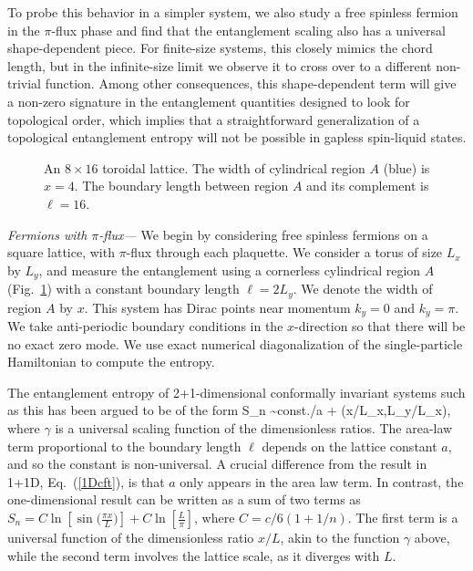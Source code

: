 \documentclass[prl,aps,twocolumn,floatfix,amsmath,amssymb,superscriptaddress,tightenlines]{revtex4}
\begin{document}
To probe this behavior in a simpler system, we also study
a free spinless fermion in the $\pi$-flux phase and find that the entanglement scaling also has a universal shape-dependent piece.
For finite-size systems, this closely mimics the chord length, but in the infinite-size limit we observe it to cross over to a different non-trivial function.
Among other consequences, this shape-dependent term will give a non-zero signature in the entanglement quantities \cite{KP,LW} designed to look for topological order, which implies that a straightforward generalization of a topological entanglement entropy will not be possible in gapless spin-liquid states. 
 
  \begin{figure}
   \begin{center}
   \end{center}
   \caption{An $8 \times 16$ toroidal lattice.  The width of cylindrical region $A$ (blue) is $x=4$.  The boundary length between region $A$ and its complement is $\ell = 16$. }
   \label{fig:torus}
 \end{figure}
 
{\it Fermions with $\pi$-flux---}
We begin by considering
free spinless fermions on a square lattice, with $\pi$-flux through each plaquette.  We consider a torus of size $L_x$ by $L_y$, and
measure the entanglement %
using a cornerless cylindrical region $A$ (Fig.~\ref{fig:torus}) with a constant boundary length $\ell = 2L_y$.
We denote the width of region $A$ by $x$.
This system has Dirac points near momentum $k_y=0$ and $k_y=\pi$.  We take anti-periodic boundary conditions in the $x$-direction so that there will be no exact zero mode.  We use exact numerical diagonalization of the single-particle Hamiltonian to compute the entropy.

The entanglement entropy of 2+1-dimensional conformally invariant systems such as this has been argued to be of the form \cite{ryu,ZGV}
\be
S_n \sim {\rm const.}\times \ell /a + \gamma(x/L_x,L_y/L_x),
\ee
where $\gamma$ is a universal scaling function of the dimensionless ratios.
The area-law term proportional to the boundary length $\ell$ depends on the lattice constant $a$, and so the constant is non-universal. A crucial difference
from the result in 1+1D, Eq.~(\ref{1Dcft}), is that $a$ only appears in the area law term.  In contrast, the one-dimensional result can be written as a sum of two terms as
$S_n =C \ln[\sin\big( \frac{\pi x}{L} \big)]+ C\ln[\frac{L}{\pi}] $, where $C=c/6(1+1/n)$.
The first term is a universal function of the dimensionless ratio $x/L$, akin to the function $\gamma$ above, while the second term involves the lattice scale, as it diverges with $L$.
\end{document}
